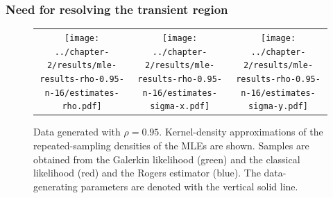 \documentclass{beamer}
\begin{document}
\begin{frame}
  \frametitle{Need for resolving the transient region}

  \begin{figure}
  \centering
  \begin{tabular}{ccc}
    
    \begin{minipage}{0.3\textwidth}
      \centering
      \texttt{[image: ../chapter-2/results/mle-results-rho-0.95-n-16/estimates-rho.pdf]}
    \end{minipage}
    & \begin{minipage}{0.3\textwidth}
      \centering
      \texttt{[image: ../chapter-2/results/mle-results-rho-0.95-n-16/estimates-sigma-x.pdf]}
    \end{minipage}
    & \begin{minipage}{0.3\textwidth}
      \centering
      \texttt{[image: ../chapter-2/results/mle-results-rho-0.95-n-16/estimates-sigma-y.pdf]}
    \end{minipage}
  \end{tabular}
  \caption{Data generated with $\rho=0.95$. Kernel-density
    approximations of the repeated-sampling densities of the MLEs are
    shown.  Samples are obtained from the Galerkin likelihood (green)
    and the classical likelihood (red) and the Rogers estimator
    (blue). The data-generating parameters are denoted with the
    vertical solid line.}
  \label{fig:mle-comparison-rho-0.95}
\end{figure}
  
\end{frame}


\end{document}
